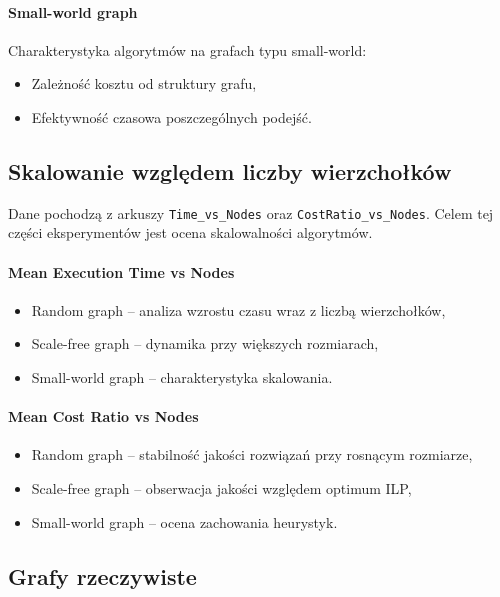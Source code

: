 \paragraph{Small-world graph}
Charakterystyka algorytmów na grafach typu small-world:
\begin{itemize}
    \item Zależność kosztu od struktury grafu,
    \item Efektywność czasowa poszczególnych podejść.
\end{itemize}

\subsection{Skalowanie względem liczby wierzchołków}

Dane pochodzą z arkuszy \texttt{Time\_vs\_Nodes} oraz \texttt{CostRatio\_vs\_Nodes}. 
Celem tej części eksperymentów jest ocena skalowalności algorytmów.

\paragraph{Mean Execution Time vs Nodes}
\begin{itemize}
    \item Random graph – analiza wzrostu czasu wraz z liczbą wierzchołków,
    \item Scale-free graph – dynamika przy większych rozmiarach,
    \item Small-world graph – charakterystyka skalowania.
\end{itemize}

\paragraph{Mean Cost Ratio vs Nodes}
\begin{itemize}
    \item Random graph – stabilność jakości rozwiązań przy rosnącym rozmiarze,
    \item Scale-free graph – obserwacja jakości względem optimum ILP,
    \item Small-world graph – ocena zachowania heurystyk.
\end{itemize}

\subsection{Grafy rzeczywiste}

